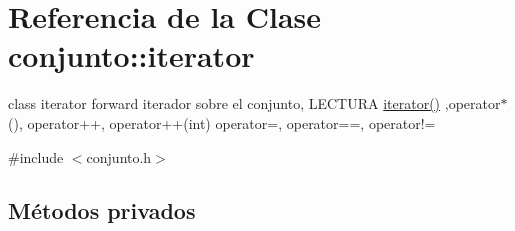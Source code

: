 \hypertarget{classconjunto_1_1iterator}{}\section{Referencia de la Clase conjunto\+:\+:iterator}
\label{classconjunto_1_1iterator}


class iterator forward iterador sobre el conjunto, L\+E\+C\+T\+U\+R\+A \hyperlink{classconjunto_1_1iterator_ae3ade272e78f6888c39ad44a8b4b152a}{iterator()} ,operator$\ast$(), operator++, operator++(int) operator=, operator==, operator!=  




{\ttfamily \#include $<$conjunto.\+h$>$}

\subsection*{Métodos privados}
